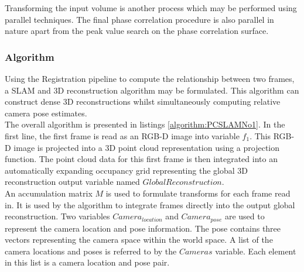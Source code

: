 Transforming the input volume is another process which may be performed using parallel techniques. The final phase correlation procedure is also parallel in nature apart from the peak value search on the phase correlation surface. \\



\subsubsection{Algorithm}

Using the Registration pipeline to compute the relationship between two frames, a SLAM and 3D reconstruction algorithm may be formulated. This algorithm can construct dense 3D reconstructions whilst simultaneously computing relative camera pose estimates. \\

 
The overall algorithm is presented in listings \ref{algorithm:PCSLAMNo1}. In the first line, the first frame is read as an RGB-D image into variable $f_1$. This RGB-D image is projected into a 3D point cloud representation using a projection function. The point cloud data for this first frame is then integrated into an automatically expanding occupancy grid representing the global 3D reconstruction output variable named $GlobalReconstruction$. \\

An accumulation matrix $M$ is used to formulate transforms for each frame read in. It is used by the algorithm to integrate frames directly into the output global reconstruction. Two variables $Camera_{location}$ and $Camera_{pose}$ are used to represent the camera location and pose information. The pose contains three vectors representing the camera space within the world space. A list of the camera locations and poses is referred to by the $Cameras$ variable. Each element in this list is a camera location and pose pair. \\


